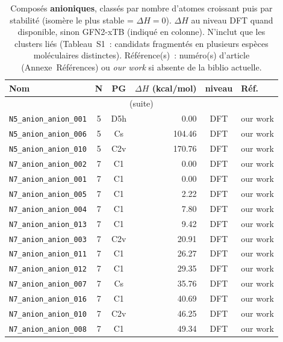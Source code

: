 {\scriptsize
\begin{longtable}{@{}p{4.7cm}ccrcp{1.6cm}@{}}
\caption{Compos\'es \textbf{anioniques}, class\'es par nombre d'atomes croissant puis par stabilit\'e (isom\`ere le plus stable = $\Delta H=0$). $\Delta H$ au niveau DFT quand disponible, sinon GFN2-xTB (indiqu\'e en colonne). N'inclut que les clusters li\'es (Tableau~S1~: candidats fragment\'es en plusieurs esp\`eces mol\'eculaires distinctes). R\'ef\'erence(s)~: num\'ero(s) d'article (Annexe~R\'ef\'erences) ou \emph{our work} si absente de la biblio actuelle.}
\label{tab:provenance-anion}\\
\toprule
\textbf{Nom} & \textbf{N} & \textbf{PG} & \textbf{$\Delta H$ (kcal/mol)} & \textbf{niveau} & \textbf{R\'ef.} \\
\midrule\endfirsthead
\multicolumn{6}{c}{\small (suite)}\\ \toprule\endhead
\bottomrule\endfoot
\bottomrule\endlastfoot
\addlinespace
\texttt{N5\_anion\_anion\_001} & 5 & D5h & 0.00 & DFT & our work \\
\texttt{N5\_anion\_anion\_006} & 5 & Cs & 104.46 & DFT & our work \\
\texttt{N5\_anion\_anion\_010} & 5 & C2v & 170.76 & DFT & our work \\
\addlinespace
\texttt{N7\_anion\_anion\_002} & 7 & C1 & 0.00 & DFT & our work \\
\texttt{N7\_anion\_anion\_001} & 7 & C1 & 0.00 & DFT & our work \\
\texttt{N7\_anion\_anion\_005} & 7 & C1 & 2.22 & DFT & our work \\
\texttt{N7\_anion\_anion\_004} & 7 & C1 & 7.80 & DFT & our work \\
\texttt{N7\_anion\_anion\_013} & 7 & C1 & 9.42 & DFT & our work \\
\texttt{N7\_anion\_anion\_003} & 7 & C2v & 20.91 & DFT & our work \\
\texttt{N7\_anion\_anion\_011} & 7 & C1 & 26.27 & DFT & our work \\
\texttt{N7\_anion\_anion\_012} & 7 & C1 & 29.35 & DFT & our work \\
\texttt{N7\_anion\_anion\_007} & 7 & Cs & 35.76 & DFT & our work \\
\texttt{N7\_anion\_anion\_016} & 7 & C1 & 40.69 & DFT & our work \\
\texttt{N7\_anion\_anion\_010} & 7 & C2v & 46.25 & DFT & our work \\
\texttt{N7\_anion\_anion\_008} & 7 & C1 & 49.34 & DFT & our work \\

\end{longtable}}
